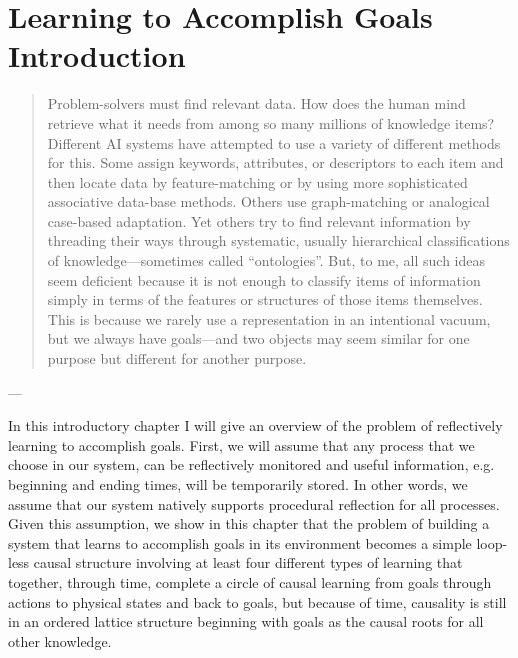 \chapter{Learning to Accomplish Goals Introduction}\label{ch:learning_to_accomplish_goals_introduction}

\begin{quote}
  Problem-solvers must find relevant data.  How does the human mind
  retrieve what it needs from among so many millions of knowledge items?
  Different AI systems have attempted to use a variety of different
  methods for this.  Some assign keywords, attributes, or descriptors to
  each item and then locate data by feature-matching or by using more
  sophisticated associative data-base methods.  Others use
  graph-matching or analogical case-based adaptation.  Yet others try to
  find relevant information by threading their ways through systematic,
  usually hierarchical classifications of knowledge---sometimes called
  ``ontologies''.  But, to me, all such ideas seem deficient because it
  is not enough to classify items of information simply in terms of the
  features or structures of those items themselves.  This is because we
  rarely use a representation in an intentional vacuum, but we always
  have goals---and two objects may seem similar for one purpose but
  different for another purpose.
\end{quote}
\begin{flushright}
  --- 
\end{flushright}

In this introductory chapter I will give an overview of the problem of
reflectively learning to accomplish goals.  First, we will assume that
any process that we choose in our system, can be reflectively
monitored and useful information, e.g. beginning and ending times,
will be temporarily stored.  In other words, we assume that our system
natively supports procedural reflection for all processes.  Given this
assumption, we show in this chapter that the problem of building a
system that learns to accomplish goals in its environment becomes a
simple loop-less causal structure involving at least four different
types of learning that together, through time, complete a circle of
causal learning from goals through actions to physical states and back
to goals, but because of time, causality is still in an ordered
lattice structure beginning with goals as the causal roots for all
other knowledge.


